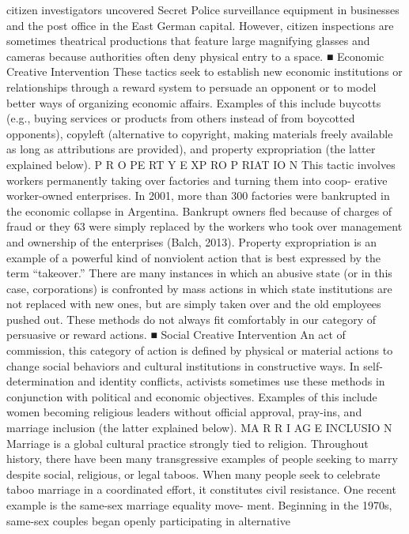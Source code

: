 \documentclass[twoside,a4paper,12pt,fleqn,openany]{extbook}
\begin{document}
citizen investigators uncovered Secret Police surveillance equipment in businesses and
the post office in the East German capital.
However, citizen inspections are sometimes theatrical productions that feature large
magnifying glasses and cameras because authorities often deny physical entry to a space.
■ Economic Creative Intervention
These tactics seek to establish new economic institutions or relationships through a reward
system to persuade an opponent or to model better ways of organizing economic affairs.
Examples of this include buycotts (e.g., buying services or products from others instead of from
boycotted opponents), copyleft (alternative to copyright, making materials freely available as
long as attributions are provided), and property expropriation (the latter explained below).
P R O PE RT Y E XP RO P RIAT IO N
This tactic involves workers permanently taking over factories and turning them into coop-
erative worker-owned enterprises. In 2001, more than 300 factories were bankrupted in the
economic collapse in Argentina. Bankrupt owners fled because of charges of fraud or they
63
were simply replaced by the workers who took over management and ownership of the
enterprises (Balch, 2013).
Property expropriation is an example of a powerful kind of nonviolent action that is best
expressed by the term “takeover.” There are many instances in which an abusive state (or in
this case, corporations) is confronted by mass actions in which state institutions are not
replaced with new ones, but are simply taken over and the old employees pushed out. These
methods do not always fit comfortably in our category of persuasive or reward actions.
■ Social Creative Intervention
An act of commission, this category of action is defined by physical or material actions to
change social behaviors and cultural institutions in constructive ways. In self-determination
and identity conflicts, activists sometimes use these methods in conjunction with political and
economic objectives. Examples of this include women becoming religious leaders without
official approval, pray-ins, and marriage inclusion (the latter explained below).
MA R R I AG E INCLUSIO N
Marriage is a global cultural practice strongly tied to religion. Throughout history, there have
been many transgressive examples of people seeking to marry despite social, religious, or
legal taboos. When many people seek to celebrate taboo marriage in a coordinated effort,
it constitutes civil resistance. One recent example is the same-sex marriage equality move-
ment. Beginning in the 1970s, same-sex couples began openly participating in alternative
\end{document}
